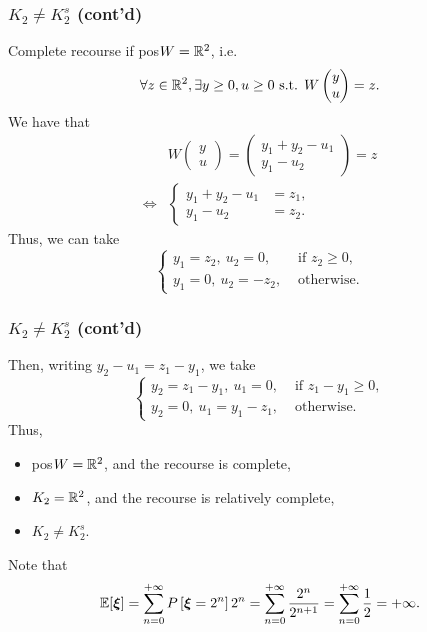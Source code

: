 \documentclass[aspectratio=169]{beamer}
\begin{document}
\begin{frame}
\frametitle{$K_2 \ne K_2^s$ (cont'd)}

Complete recourse if pos$W = {\mathbb{R}}^2$, i.e.
$$
\forall z \in {\mathbb{R}}^2, \exists y \geq 0, u \geq 0 \text{ s.t. } W\begin{pmatrix} y \\ u \end{pmatrix} = z.
$$
We have that
\begin{align*}
& W\begin{pmatrix} y \\ u \end{pmatrix} = \begin{pmatrix} y_1 + y_2 - u_1 \\ y_1 - u_2 \end{pmatrix} = z \\
\Leftrightarrow &
\begin{cases}
	y_1 + y_2 - u_1 &= z_1, \\ y_1 - u_2 &= z_2.
\end{cases}
\end{align*}
Thus, we can take
$$
\begin{cases}
 y_1 = z_2,\ u_2 = 0, & \text{ if } z_2 \geq 0,\\
 y_1 = 0,\ u_2 = -z_2, & \text{ otherwise}.
\end{cases}
$$

\end{frame}

\begin{frame}
\frametitle{$K_2 \ne K_2^s$ (cont'd)}

Then, writing $y_2 - u_1 = z_1 - y_1$, we take
$$
\begin{cases}
	y_2 = z_1 - y_1,\ u_1 = 0, & \text{ if } z_1 - y_1 \geq 0,\\
	y_2 = 0,\ u_1 = y_1 - z_1, & \text{ otherwise}.
\end{cases}
$$
Thus,
\begin{itemize}
	\item 
	pos$W = {\mathbb{R}}^2$, and the recourse is complete,
	\item
	$K_2 = {\mathbb{R}}^2$, and the recourse is relatively complete,
	\item
	{\red $K_2 \ne K_2^s$}.
\end{itemize}

\mbox{}

Note that
$$
{\mathbb{E}}[{\boldsymbol{\xi}}] = \sum_{n=0}^{+\infty} P\left[ {\boldsymbol{\xi}} = 2^n \right] 2^n = \sum_{n=0}^{+\infty} \frac{2^n}{2^{n+1}} = \sum_{n=0}^{+\infty} \frac{1}{2} = +\infty.
$$

\end{frame}
\end{document}
